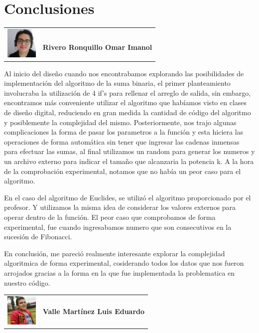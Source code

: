 \documentclass{report}
\begin{document}
\newpage
\vspace*{3\baselineskip}
\section*{Conclusiones}
    \begin{tabular}{l l}
        \multirow{3}{*}{\includegraphics[width=1.5cm]{Imagenes/imanol.jpg}} &  \\
        & \textbf{Rivero Ronquillo Omar Imanol}
    \end{tabular}
    \vspace*{3\baselineskip}
    
    Al inicio del diseño cuando nos encontrabamos explorando las posibilidades de implementación del algoritmo de la suma binaria, el primer planteamiento involucraba la utilización de 4 if's para rellenar el arreglo de salida, sin embargo, encontramos m\'as conveniente utilizar el algoritmo que habíamos visto en clases de diseño digital, reduciendo en gran medida la cantidad de código del algoritmo y posiblemente la complejidad del mismo. Posteriormente, nos trajo algunas complicaciones la forma de pasar los parametros a la función y esta hiciera las operaciones de forma autom\'atica sin tener que ingresar las cadenas inmensas para efectuar las sumas, al final utilizamos un random para generar los numeros y un archivo externo para indicar el tamaño que alcanzaria la potencia k. A la hora de la comprobación experimental, notamos que no había un peor caso para el algoritmo.
    
    En el caso del algoritmo de Euclides, se utiliz\'o el algoritmo proporcionado por el profesor. Y utilizamos la misma idea de considerar los valores externos para operar dentro de la funci\'on. El peor caso que comprobamos de forma experimental, fue cuando ingresabamos numero que son consecutivos en la sucesión de Fibonacci.
    
    En conclusión, me pareci\'o realmente interesante explorar la complejidad algoritmica de forma experimental, cosiderando todos los datos que nos fueron arrojados gracias a la forma en la que fue implementada la problematica en nuestro c\'odigo.
    \hfill \break
    \hfill \break
    
    \begin{tabular}{l l}
        \multirow{3}{*}{\includegraphics[width=1.5cm]{Imagenes/lalo.jpg}}  &  \\
        & \textbf{Valle Mart\'inez Luis Eduardo} \\
        & \\
    \end{tabular}
    
\end{document}
